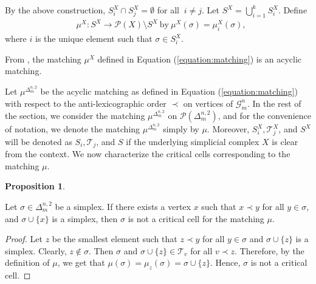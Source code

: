 \documentclass{amsart}
\theoremstyle{definition}
\newtheorem{proposition}[theorem]{Proposition}
\theoremstyle{remark}
\numberwithin{equation}{section}
\newcommand{\G}{\mathcal{G}}
\newcommand{\cP}{\mathcal{P}}
\newcommand{\T}{\mathcal{T}}
\begin{document}
By the above construction, $S_{i}^X \cap S_j^X =\emptyset$ for all  $\ i \neq j$.
Let $S^X = \bigcup \limits_{i=1}^{k} S_{i}^X$. Define 
\begin{align}\label{equation:matching}
	&\mu^X : S^X \rightarrow \cP(X) \setminus S^X \ \text{by} \ \mu^X(\sigma) =\mu_{i}^X (\sigma),  
\end{align}
where $i$ is the unique element such that $\sigma \in S_{i}^X$.



From \cite[Proposition 3.2]{Goyal2021}, the matching $\mu^X$ defined in Equation (\ref{equation:matching}) is an acyclic matching. 






Let $\mu^{\Delta_m^{n,2}}$ be the acyclic matching as defined in Equation (\ref{equation:matching}) with respect to the anti-lexicographic order $\prec$ on vertices of $\G_m^n$. In the rest of the section, we consider the matching $\mu^{\Delta_m^{n,2}}$ on $\cP(\Delta_m^{n,2})$, and for the convenience of notation, we denote the matching $\mu^{\Delta_m^{n,2}}$ simply by $\mu$. 
Moreover, $S_{i}^X,\T_{j}^X$, and $S^{X}$ will be denoted as $S_{i},\T_{j}$, and $S$ if the underlying simplicial complex $X$ is clear from the context. We now characterize the critical cells corresponding to the matching $\mu$.


\begin{proposition}\label{smallestvertex}
	
	Let $\sigma \in \Delta_m^{n,2}$ be a simplex. If there exists a vertex $x$ such that $x \prec y$ for all $y \in \sigma$, and $\sigma \cup \{x\} $ is a simplex, then  $\sigma$ is not a critical cell for the matching $\mu$. 
\end{proposition}
\begin{proof}
	Let $z$ be the smallest element such that $z \prec y$ for all $y \in \sigma$ and $\sigma \cup \{z\}$ is a simplex. Clearly, $z \notin \sigma$. Then $\sigma$ and $\sigma \cup \{z\} \in \T_{v}$ for all $v \prec z$. Therefore, by the definition of $\mu$, we get that $\mu(\sigma) = \mu_z(\sigma) = \sigma \cup \{z\}$. Hence, $\sigma$ is not a critical cell.
\end{proof}
\end{document}
